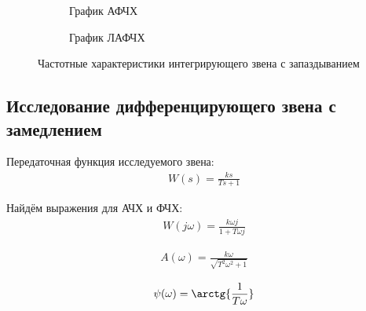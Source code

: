 \documentclass[a4paper, 12pt]{article}
\begin{document}
\begin{figure}[h!]
    \begin{subfigure}{0.5\textwidth}
        \centering
        \caption{График АФЧХ}
    \end{subfigure}
    \begin{subfigure}{0.5\textwidth}
        \centering
        \caption{График ЛАФЧХ}
    \end{subfigure}
    \caption{Частотные характеристики интегрирующего звена с запаздыванием}
\end{figure}

\newpage
\begin{center}
	\section{Исследование дифференцирующего звена с замедлением}
\end{center}

\par 
Передаточная функция исследуемого звена:
\begin{align}
	W(s)=\frac{ks}{Ts+1}
\end{align}
\par 
Найдём выражения для АЧХ и ФЧХ:
\begin{align}
W(j\omega) = \frac{k\omega j}{1+T \omega j}
\end{align}

\begin{align}
	A(\omega) = \frac{k\omega}{\sqrt{T^2\omega^2 + 1}}
\end{align}

\begin{align}
\psi(\omega) = \arctg{\frac{1}{T\omega}}
\end{align}
\end{document}
